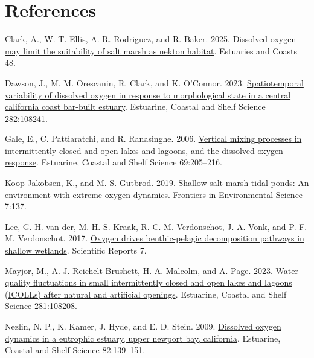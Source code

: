 \documentclass[
  letterpaper,
  DIV=11,
  numbers=noendperiod]{scrartcl}
\newlength{\cslhangindent}
\newenvironment{CSLReferences}[2] %
 {\begin{list}{}{%
  \setlength{\itemindent}{0pt}
  \setlength{\leftmargin}{0pt}
  \setlength{\parsep}{0pt}
  \ifodd #1
   \setlength{\leftmargin}{\cslhangindent}
   \setlength{\itemindent}{-1\cslhangindent}
  \fi
  \setlength{\itemsep}{#2\baselineskip}}}
 {\end{list}}
\begin{document}
\section*{References}\label{references}

\protect{}\label{refs}
\begin{CSLReferences}{1}{0}
Clark, A., W. T. Ellis, A. R. Rodriguez, and R. Baker. 2025.
\href{https://doi.org/10.1007/s12237-025-01525-0}{Dissolved oxygen may
limit the suitability of salt marsh as nekton habitat}. Estuaries and
Coasts 48.

Dawson, J., M. M. Orescanin, R. Clark, and K. O'Connor. 2023.
\href{https://doi.org/10.1016/j.ecss.2023.108241}{Spatiotemporal
variability of dissolved oxygen in response to morphological state in a
central california coast bar-built estuary}. Estuarine, Coastal and
Shelf Science 282:108241.

Gale, E., C. Pattiaratchi, and R. Ranasinghe. 2006.
\href{https://doi.org/10.1016/j.ecss.2006.04.013}{Vertical mixing
processes in intermittently closed and open lakes and lagoons, and the
dissolved oxygen response}. Estuarine, Coastal and Shelf Science
69:205--216.

Koop-Jakobsen, K., and M. S. Gutbrod. 2019.
\href{https://doi.org/10.3389/fenvs.2019.00137}{Shallow salt marsh tidal
ponds: An environment with extreme oxygen dynamics}. Frontiers in
Environmental Science 7:137.

Lee, G. H. van der, M. H. S. Kraak, R. C. M. Verdonschot, J. A. Vonk,
and P. F. M. Verdonschot. 2017.
\href{https://doi.org/10.1038/s41598-017-15432-3}{Oxygen drives
benthic-pelagic decomposition pathways in shallow wetlands}. Scientific
Reports 7.

Mayjor, M., A. J. Reichelt-Brushett, H. A. Malcolm, and A. Page. 2023.
\href{https://doi.org/10.1016/j.ecss.2022.108208}{Water quality
fluctuations in small intermittently closed and open lakes and lagoons
(ICOLLs) after natural and artificial openings}. Estuarine, Coastal and
Shelf Science 281:108208.

Nezlin, N. P., K. Kamer, J. Hyde, and E. D. Stein. 2009.
\href{https://doi.org/10.1016/j.ecss.2009.01.004}{Dissolved oxygen
dynamics in a eutrophic estuary, upper newport bay, california}.
Estuarine, Coastal and Shelf Science 82:139--151.


\end{CSLReferences}
\end{document}
